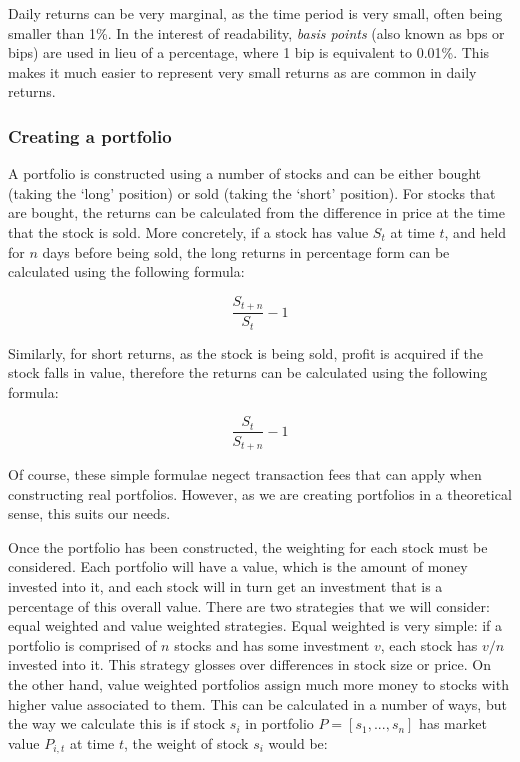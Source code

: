 Daily returns can be very marginal, as the time period is very small, often being smaller than 1\%. In the interest of readability, \textit{basis points} (also known as bps or bips) are used in lieu of a percentage, where 1 bip is equivalent to 0.01\%. This makes it much easier to represent very small returns as are common in daily returns.

\subsubsection{Creating a portfolio}
A portfolio is constructed using a number of stocks and can be either bought (taking the `long' position) or sold (taking the `short' position). For stocks that are bought, the returns can be calculated from the difference in price at the time that the stock is sold. More concretely, if a stock has value $S_{t}$ at time $t$, and held for $n$ days before being sold, the long returns in percentage form can be calculated using the following formula:

\begin{equation}
\frac{S_{t+n}}{S_{t}} - 1
\end{equation}

\noindent
Similarly, for short returns, as the stock is being sold, profit is acquired if the stock falls in value, therefore the returns can be calculated using the following formula:

\begin{equation}
\frac{S_{t}}{S_{t+n}} - 1
\end{equation}

\noindent
Of course, these simple formulae negect transaction fees that can apply when constructing real portfolios. However, as we are creating portfolios in a theoretical sense, this suits our needs.

Once the portfolio has been constructed, the weighting for each stock must be considered. Each portfolio will have a value, which is the amount of money invested into it, and each stock will in turn get an investment that is a percentage of this overall value. There are two strategies that we will consider: equal weighted and value weighted strategies. Equal weighted is very simple: if a portfolio is comprised of $n$ stocks and has some investment $v$, each stock has $v/n$ invested into it. This strategy glosses over differences in stock size or price. On the other hand, value weighted portfolios assign much more money to stocks with higher value associated to them. This can be calculated in a number of ways, but the way we calculate this is if stock $s_i$ in portfolio $P = [s_1, ..., s_n]$ has market value $P_{i,t}$ at time $t$, the weight of stock $s_i$ would be:

